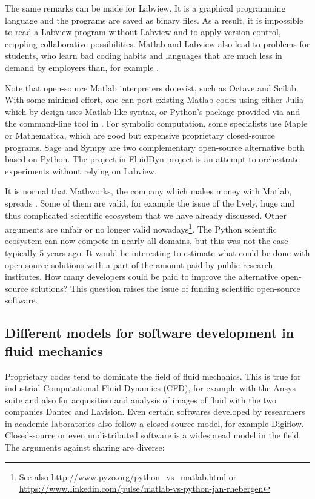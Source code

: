 The same remarks can be made for Labview. It is a graphical programming
language and the programs are saved as binary files. As a result, it is
impossible to read a Labview program without Labview and to apply version
control, crippling collaborative possibilities.
%
Matlab and Labview also lead to problems for students, who learn bad coding
habits and languages that are much less in demand by employers than, for example
.

Note that open-source Matlab interpreters do exist, such as Octave and Scilab.
%
With some minimal effort, one can port existing Matlab codes using either
Julia which by design uses Matlab-like syntax, or Python's 
package provided via  and the command-line tool
 in .
%
For symbolic computation, some specialists use Maple or Mathematica, which are
good but expensive proprietary closed-source programs.
%
Sage and Sympy are two complementary open-source alternative both based on
Python.
%
The  project in FluidDyn project is an attempt to orchestrate
experiments without relying on Labview.

It is normal that Mathworks, the company which makes money with Matlab, spreads
.  Some of them are valid, for
example the issue of the lively, huge and thus complicated scientific ecosystem
that we have already discussed. Other arguments are unfair or no longer valid
nowadays\footnote{See also \url{http://www.pyzo.org/python\_vs\_matlab.html}
or \url{https://www.linkedin.com/pulse/matlab-vs-python-jan-rhebergen}}.
%
The Python scientific ecosystem can now compete in nearly all domains, but this
was not the case typically 5 years ago.
%
It would be interesting to estimate what could be done with open-source
solutions with a part of the amount paid by public research institutes. How
many developers could be paid to improve the alternative open-source solutions?
%
This question raises the issue of funding scientific open-source software.


\subsection{Different models for software development in fluid mechanics}

Proprietary codes tend to dominate the field of fluid mechanics. This is true
for industrial Computational Fluid Dynamics (CFD), for example with the Ansys
suite and also for acquisition and analysis of images of fluid with the
two companies Dantec and Lavision.
%
Even certain softwares developed by researchers in academic laboratories
also follow a closed-source model, for example
\href{http://www.damtp.cam.ac.uk/user/fdl/digiflow/index.htm}{Digiflow}.
%
Closed-source or even undistributed software is a widespread model in the
field.
%
The arguments against sharing are diverse:

